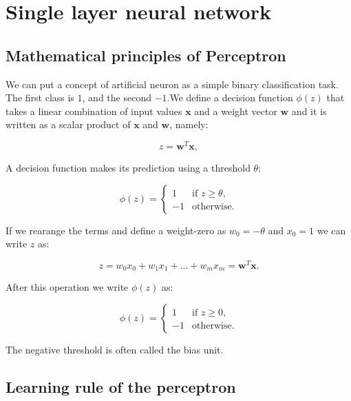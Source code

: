 \documentclass[a4paper,oneside,openright,11pt]{book}
\begin{document}
\section{Single layer neural network}

\subsection{Mathematical principles of Perceptron}

We can put a concept of artificial neuron as a simple binary classification task. The first class is $1$, and the second $-1$.We define a decision function $\phi(z)$ that takes a linear combination of input values $\textbf{x}$ and a weight vector $\textbf{w}$ and it is written as a scalar product of $\textbf{x}$ and $\textbf{w}$, namely:


\begin{equation*}
    z = \textbf{w}^{T}\textbf{x},
\end{equation*}

A decision function makes its prediction using a threshold $\theta$:

\begin{equation}
    \phi(z) = 
\begin{cases}
     1  & \text{if } z \geq \theta, \\
-1  & \text{otherwise.}
\end{cases}
\end{equation}

If we rearange the terms and define a weight-zero as $w_{0} = - \theta$ and $x_{0} = 1$ we can write $z$ as:

\begin{equation*}
    z = w_{0}x_{0} + w_{1}x_{1} + ... + w_{m}x_{m} = \textbf{w}^{T}\textbf{x}.
\end{equation*}

After this operation we write $\phi(z)$ as:

\begin{equation} \label{step_function}
    \phi(z) = 
\begin{cases}
     1  & \text{if } z \geq 0, \\
-1  & \text{otherwise.}
\end{cases}
\end{equation}


The negative threshold is often called the bias unit\cite{raschka}.

\subsection{Learning rule of the perceptron}
\end{document}
